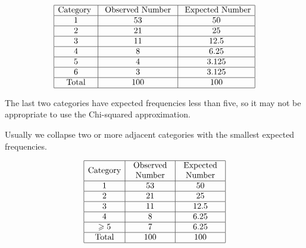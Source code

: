 \[ \begin{array}{|c|c|c|}
        \hline \text{Category } & \text{ Observed Number } & \text{ Expected Number} \\
        \hline 1                & 53                       & 50                      \\
        \hline 2                & 21                       & 25                      \\
        \hline 3                & 11                       & 12.5                    \\
        \hline 4                & 8                        & 6.25                    \\
        \hline 5                & 4                        & 3.125                   \\
        \hline 6                & 3                        & 3.125                   \\
        \hline \text{Total}     & 100                      & 100                     \\
        \hline
    \end{array} \]

The last two categories have expected frequencies less than five, so it may not be
appropriate to use the Chi-squared approximation.

Usually we collapse two or more adjacent categories with the smallest expected frequencies.

\[ \begin{array}{|c|c|c|}
        \hline \text{Category} & \begin{array}{c}
            \text{Observed} \\
            \text{Number}
        \end{array} & \begin{array}{c}
            \text{Expected} \\
            \text{Number}
        \end{array} \\
        \hline 1               & 53                         & 50                         \\
        \hline 2               & 21                         & 25                         \\
        \hline 3               & 11                         & 12.5                       \\
        \hline 4               & 8                          & 6.25                       \\
        \hline \geqslant{5}    & 7                          & 6.25                       \\
        \hline \text{Total}    & 100                        & 100                        \\
        \hline
    \end{array} \]

